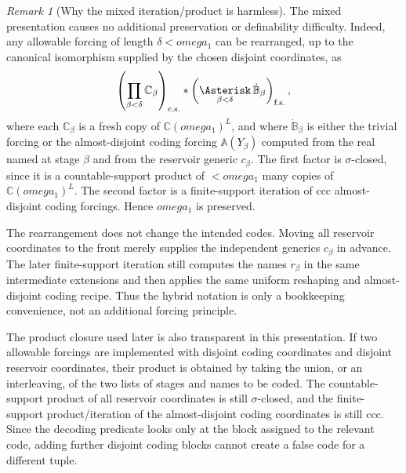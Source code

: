 \documentclass{article}
\theoremstyle{remark}
\newtheorem{remark}[theorem]{Remark}
\theoremstyle{plain}
\def\omega{omega}%
\begin{document}
\begin{remark}[Why the mixed iteration/product is harmless]\label{rem:mixed-harmless}
The mixed presentation causes no additional preservation or definability difficulty. Indeed, any allowable forcing of length \(\delta<\omega_1\) can be rearranged, up to the canonical isomorphism supplied by the chosen disjoint coordinates, as
\[
   \left(\prod_{\beta<\delta}\mathbb C_\beta\right)_{\textup{c.s.}}
   *
   \left(\mathop{\Asterisk}_{\beta<\delta}\dot{\mathbb B}_\beta\right)_{\textup{f.s.}},
\]
where each \(\mathbb C_\beta\) is a fresh copy of \(\mathbb C(\omega_1)^L\), and where \(\dot{\mathbb B}_\beta\) is either the trivial forcing or the almost-disjoint coding forcing \(\mathbb A(Y_\beta)\) computed from the real named at stage \(\beta\) and from the reservoir generic \(c_\beta\). The first factor is \(\sigma\)-closed, since it is a countable-support product of \(<\omega_1\) many copies of \(\mathbb C(\omega_1)^L\). The second factor is a finite-support iteration of ccc almost-disjoint coding forcings. Hence \(\omega_1\) is preserved.

The rearrangement does not change the intended codes. Moving all reservoir coordinates to the front merely supplies the independent generics \(c_\beta\) in advance. The later finite-support iteration still computes the names \(\dot r_\beta\) in the same intermediate extensions and then applies the same uniform reshaping and almost-disjoint coding recipe. Thus the hybrid notation is only a bookkeeping convenience, not an additional forcing principle.
\end{remark}

The product closure used later is also transparent in this presentation. If two allowable forcings are implemented with disjoint coding coordinates and disjoint reservoir coordinates, their product is obtained by taking the union, or an interleaving, of the two lists of stages and names to be coded. The countable-support product of all reservoir coordinates is still \(\sigma\)-closed, and the finite-support product/iteration of the almost-disjoint coding coordinates is still ccc. Since the decoding predicate looks only at the block assigned to the relevant code, adding further disjoint coding blocks cannot create a false code for a different tuple.
\end{document}
